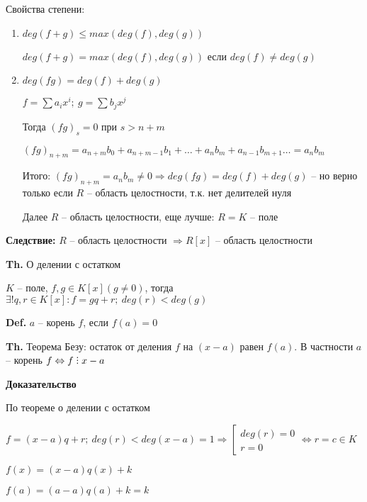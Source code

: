 \documentclass[14pt, letter paper]{article}
\DeclareRobustCommand{\divby}{%
  \mathrel{\text{\vbox{\baselineskip.65ex\lineskiplimit0pt\hbox{.}\hbox{.}\hbox{.}}}}%
}
\begin{document}
\vspace{5mm}

Свойства степени:

\begin{enumerate}
    \item $deg(f + g) \leq max(deg(f), deg(g))$

    $deg(f + g) = max(deg(f), deg(g))$ если $deg(f) \neq deg(g)$

    \item $deg(fg) = deg(f) + deg(g)$

    $f = \sum a_ix^i;\ g = \sum b_jx^j$

    Тогда $(fg)_s = 0$ при $s > n + m$

    $(fg)_{n+m} = a_{n+m}b_0 + a_{n+m-1}b_1 + \ldots + a_nb_m + a_{n-1}b_{m+1} \ldots = a_nb_m$

    Итого: $(fg)_{n+m} = a_nb_m \neq 0 \Rightarrow deg(fg) = deg(f) + deg(g)$ -- но верно только если $R$ -- область целостности, т.к. нет делителей нуля

    Далее $R$ -- область целостности, еще лучше: $R = K$ -- поле
\end{enumerate}

\textbf{Следствие:} $R$ -- область целостности $\Rightarrow R[x]$ -- область целостности 

\vspace{5mm}

\textbf{Th.} О делении с остатком

$K$ -- поле, $f, g \in K[x] (g \neq 0)$, тогда $\exists! q, r \in K[x] : f = gq + r;\ deg(r) < deg(g)$

\textbf{Def.} $a$ -- корень $f$, если $f(a) = 0$

\textbf{Th.} Теорема Безу: остаток от деления $f$ на $(x - a)$ равен $f(a)$. В частности $a$ -- корень $f \Leftrightarrow f \divby x - a$

\begin{center}
    \textbf{Доказательство}
\end{center}

По теореме о делении с остатком

$f = (x-a)q + r;\ deg(r) < deg(x-a) = 1 \Rightarrow \left[ \begin{gathered}
    deg(r) = 0 \\
    r = 0
\end{gathered} \right. \Leftrightarrow r = c \in K$

$f(x) = (x - a) q(x) + k$

$f(a) = (a - a) q(a) + k = k$
\end{document}
